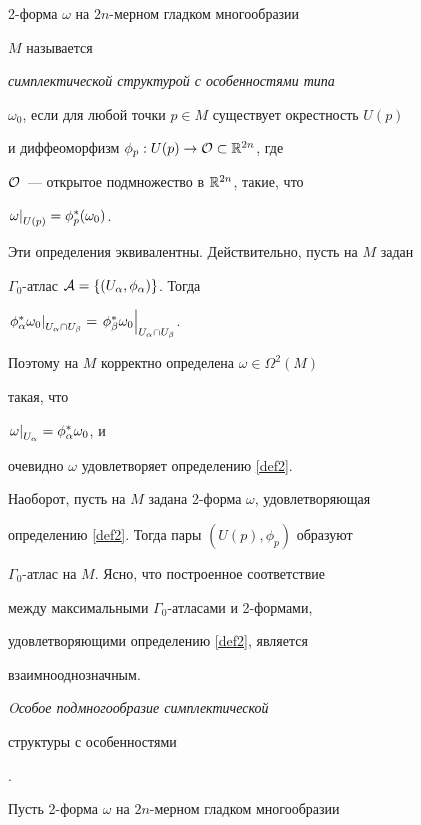 \begin{defn} \label{def2}


2-форма $\omega$ на $2n$-мерном гладком многообразии


$M$ называется


{\em симплектической структурой с особенностями типа}


$\omega_0$, если для любой точки $p \in M$ существует окрестность $U(p)$


и диффеоморфизм $\phi_p : U(p) \to {\cal O} \subset {\Bbb R}^{2n}$, где


${\cal O}$~--- открытое подмножество в ${\Bbb R}^{2n}$, такие, что


$\left. \omega \right|_{U(p)} = \phi^*_p(\omega_0)$.


\end{defn}





Эти определения эквивалентны. Действительно, пусть на $M$ задан


$\Gamma_0$-атлас ${\cal A}=\{(U_\alpha, \phi_\alpha)\}$. Тогда


$\rest{\phi_\alpha^*\omega_0}{U_\alpha \cap U_\beta} =


\rest{\phi_\beta^*\omega_0}{U_\alpha \cap U_\beta}$.


Поэтому на $M$ корректно определена $\omega \in \Omega^2(M)$


такая, что


$\left. \omega \right|_{U_\alpha} = \phi^*_\alpha \omega_0$, и


очевидно $\omega$ удовлетворяет определению \ref{def2}.


Наоборот, пусть на $M$ задана 2-форма $\omega$, удовлетворяющая


определению \ref{def2}. Тогда пары $(U(p),\phi_p)$ образуют


$\Gamma_0$-атлас на $M$. Ясно, что построенное соответствие


между максимальными $\Gamma_0$-атласами и 2-формами,


удовлетворяющими определению \ref{def2}, является


взаимнооднозначным.


\smallskip





{\it Oсобое подмногообразие симплектической


структуры с особенностями}.


Пусть 2-форма $\omega$ на $2n$-мерном гладком многообразии


